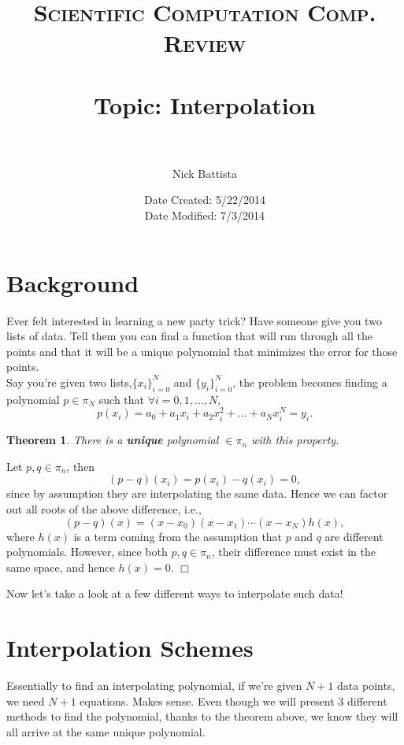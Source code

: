 \documentclass[paper=a4, fontsize=11pt]{scrartcl} %
\title{	
\normalfont \normalsize 
\textsc{Scientific Computation Comp. Review} \\ [25pt] %
\horrule{1pt} \\[0.05cm] %
\huge Topic: Interpolation \\ %
\horrule{1pt} \\[0.05cm] %
}
\author{Nick Battista} %
\date{\normalsize Date Created: 5/22/2014\\
Date Modified: 7/3/2014} %
\newtheorem{theorem}{Theorem}
\newenvironment{Proof}{{\bf Proof :}}{\hfill $\Box$ \bigskip}
\numberwithin{equation}{section} %
\numberwithin{figure}{section} %
\numberwithin{table}{section} %
\begin{document}
\maketitle %


\section{Background}

Ever felt interested in learning a new party trick? Have someone give you two lists of data. Tell them you can find a function that will run through all the points and that it will be a unique polynomial that minimizes the error for those points.\\

Say you're given two lists,$\{x_i\}_{i=0}^{N}$ and $\{y_i\}_{i=0}^{N}$, the problem becomes finding a polynomial $p\in\pi_{N}$ such that $\forall i=0,1,...,N,$ $$p(x_i) = a_0 + a_1 x_{i} + a_2 x_i^2 +...+ a_N x_i^N = y_i.$$

\begin{theorem}
There is a {\bf{unique}} polynomial $\in\pi_n$ with this property.
\end{theorem}

\begin{Proof}
Let $p,q\in\pi_n$, then $$(p-q)(x_i) = p(x_i) - q(x_i) = 0,$$ since by assumption they are interpolating the same data. Hence we can factor out all roots of the above difference, i.e.,
$$(p-q)(x) = (x-x_0)(x-x_1)\cdots(x-x_N) h(x),$$ where $h(x)$ is a term coming from the assumption that $p$ and $q$ are different polynomials. However, since both $p,q\in\pi_n$, their difference must exist in the same space, and hence $h(x)=0$.
\end{Proof}

Now let's take a look at a few different ways to interpolate such data!



%
%
%
%
%
%
\section{Interpolation Schemes}

Essentially to find an interpolating polynomial, if we're given $N+1$ data points, we need $N+1$ equations. Makes sense. Even though we will present $3$ different methods to find the polynomial, thanks to the theorem above, we know they will all arrive at the same unique polynomial. \\
\end{document}
